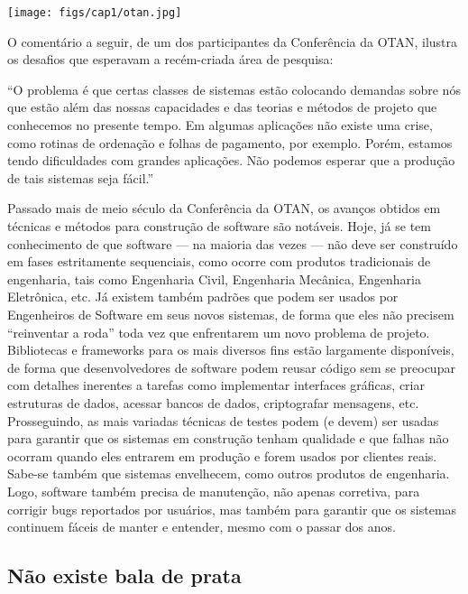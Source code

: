 \documentclass[
  11pt,
  twoside]{book}
\renewenvironment{quote}{\centering \vspace{1.5ex} \begin{tcolorbox}[colback=backcolor, width=4.9in]}{\end{tcolorbox}}
\let\origfigure\figure
\let\endorigfigure\endfigure
\renewenvironment{figure}[1][2] {
    \expandafter\origfigure\expandafter[!h]
} {
    \endorigfigure
}
\begin{document}
\begin{figure}
\centering
\texttt{[image: figs/cap1/otan.jpg]}
\caption{Cientistas na conferência da OTAN de 1968 sobre Engenharia de
Software. Reprodução gentilmente autorizada pelo Prof.~Robert McClure.}
\end{figure}

O comentário a seguir, de um dos participantes da Conferência da OTAN,
ilustra os desafios que esperavam a recém-criada área de pesquisa:

\begin{quote}
``O problema é que certas classes de sistemas estão colocando demandas
sobre nós que estão além das nossas capacidades e das teorias e métodos
de projeto que conhecemos no presente tempo. Em algumas aplicações não
existe uma crise, como rotinas de ordenação e folhas de pagamento, por
exemplo. Porém, estamos tendo dificuldades com grandes aplicações. Não
podemos esperar que a produção de tais sistemas seja fácil.''
\end{quote}

Passado mais de meio século da Conferência da OTAN, os avanços obtidos
em técnicas e métodos para construção de software são notáveis. Hoje, já
se tem conhecimento de que software --- na maioria das vezes --- não
deve ser construído em fases estritamente sequenciais, como ocorre com
produtos tradicionais de engenharia, tais como Engenharia Civil,
Engenharia Mecânica, Engenharia Eletrônica, etc. Já existem também
padrões que podem ser usados por Engenheiros de Software em seus novos
sistemas, de forma que eles não precisem ``reinventar a roda'' toda vez
que enfrentarem um novo problema de projeto. Bibliotecas e frameworks
para os mais diversos fins estão largamente disponíveis, de forma que
desenvolvedores de software podem reusar código sem se preocupar com
detalhes inerentes a tarefas como implementar interfaces gráficas, criar
estruturas de dados, acessar bancos de dados, criptografar mensagens,
etc. Prosseguindo, as mais variadas técnicas de testes podem (e devem)
ser usadas para garantir que os sistemas em construção tenham qualidade
e que falhas não ocorram quando eles entrarem em produção e forem usados
por clientes reais. Sabe-se também que sistemas envelhecem, como outros
produtos de engenharia. Logo, software também precisa de manutenção, não
apenas corretiva, para corrigir bugs reportados por usuários, mas também
para garantir que os sistemas continuem fáceis de manter e entender,
mesmo com o passar dos anos.

\hypertarget{nuxe3o-existe-bala-de-prata}{%
\subsection*{Não existe bala de
prata}\label{nuxe3o-existe-bala-de-prata}}
\end{document}
